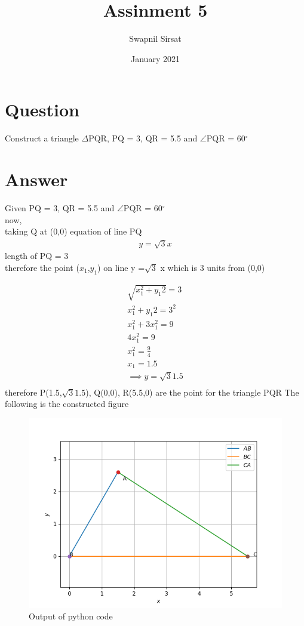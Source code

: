 \documentclass{article}
\title{Assinment 5}
\author{Swapnil Sirsat}
\date{January 2021}
\begin{document}
\maketitle

\section*{Question}
Construct a triangle $\Delta$PQR, PQ = 3, QR = 5.5 and $\angle$PQR = 60$^\circ$
\section*{Answer}
Given PQ = 3, QR = 5.5 and $\angle$PQR = 60$^\circ$ \\ 
now, \\
taking Q at (0,0)
equation of line PQ 
\begin{gather*}
    y = \sqrt{3}x
\end{gather*}
length of PQ = 3 \\
therefore the point ($x_1$,$y_1$) on line y =$\sqrt{3}$ x which is 3 units from (0,0)

\begin{gather*}
    \sqrt{x_1^{2}+y_1{2}} = 3 \\
    x_1^{2}+y_1{2} = 3^{2}\\
    x_1^{2}+3x_1^{2} = 9 \\
    4x_1^{2} = 9 \\
    x_1^{2} = \frac{9}{4}\\
    x_1 = 1.5\\
    \implies y = \sqrt{3} 1.5\\
\end{gather*}
therefore P(1.5,$\sqrt{3}1.5$), Q(0,0), R(5.5,0) are the point for the triangle PQR
\newpage
The following is the constructed figure
\begin{figure}[h!]
    \centering
    \includegraphics{Figure_1.png}
    \caption{Output of python code}
    \label{fig:my_label}
\end{figure}
\newpage
\newpage
\end{document}
